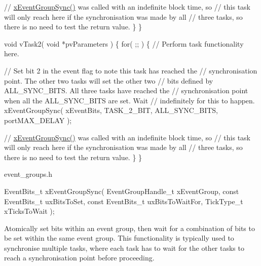 \begin{DoxyPre}       // \hyperlink{externals_2freertos_2include_2event__groups_8h_a869511456b86426f52e2eec898bff341}{xEventGroupSync()} was called with an indefinite block time, so
       // this task will only reach here if the synchronisation was made by all
       // three tasks, so there is no need to test the return value.
    \}
  \}\end{DoxyPre}



\begin{DoxyPre}  void vTask2( void *pvParameters )
  \{
    for( ;; )
    \{
       // Perform task functionality here.\end{DoxyPre}



\begin{DoxyPre}       // Set bit 2 in the event flag to note this task has reached the
       // synchronisation point.  The other two tasks will set the other two
       // bits defined by ALL\_SYNC\_BITS.  All three tasks have reached the
       // synchronisation point when all the ALL\_SYNC\_BITS are set.  Wait
       // indefinitely for this to happen.
       xEventGroupSync( xEventBits, TASK\_2\_BIT, ALL\_SYNC\_BITS, portMAX\_DELAY );\end{DoxyPre}



\begin{DoxyPre}       // \hyperlink{externals_2freertos_2include_2event__groups_8h_a869511456b86426f52e2eec898bff341}{xEventGroupSync()} was called with an indefinite block time, so
       // this task will only reach here if the synchronisation was made by all
       // three tasks, so there is no need to test the return value.
   \}
  \}\end{DoxyPre}



\begin{DoxyPre}  \end{DoxyPre}


event\+\_\+groups.\+h 
\begin{DoxyPre}
   EventBits\_t xEventGroupSync( EventGroupHandle\_t xEventGroup,
                                const EventBits\_t uxBitsToSet,
                                const EventBits\_t uxBitsToWaitFor,
                                TickType\_t xTicksToWait );
\end{DoxyPre}


Atomically set bits within an event group, then wait for a combination of bits to be set within the same event group. This functionality is typically used to synchronise multiple tasks, where each task has to wait for the other tasks to reach a synchronisation point before proceeding.

